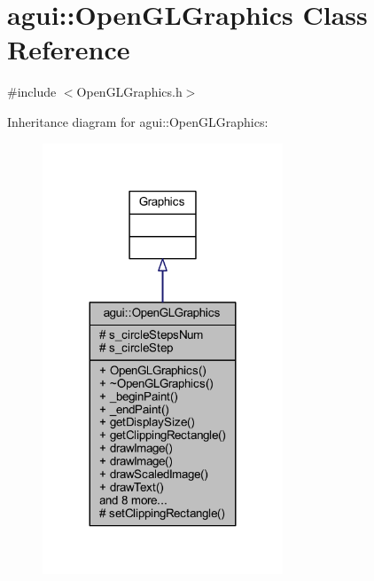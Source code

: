 \hypertarget{classagui_1_1_open_g_l_graphics}{}\section{agui\+:\+:Open\+G\+L\+Graphics Class Reference}
\label{classagui_1_1_open_g_l_graphics}


{\ttfamily \#include $<$Open\+G\+L\+Graphics.\+h$>$}



Inheritance diagram for agui\+:\+:Open\+G\+L\+Graphics\+:\nopagebreak
\begin{figure}[H]
\begin{center}
\leavevmode
\includegraphics[width=203pt]{classagui_1_1_open_g_l_graphics__inherit__graph}
\end{center}
\end{figure}


